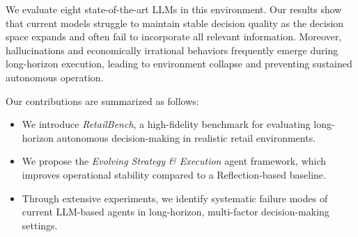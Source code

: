 We evaluate eight state-of-the-art LLMs in this environment. Our results show that current models struggle to maintain stable decision quality as the decision space expands and often fail to incorporate all relevant information. Moreover, hallucinations and economically irrational behaviors frequently emerge during long-horizon execution, leading to environment collapse and preventing sustained autonomous operation.

Our contributions are summarized as follows:
\begin{itemize}[leftmargin=*]
    \item We introduce \textit{RetailBench}, a high-fidelity benchmark for evaluating long-horizon autonomous decision-making in realistic retail environments.
    \item We propose the \textit{Evolving Strategy \& Execution} agent framework, which improves operational stability compared to a Reflection-based baseline.
    \item Through extensive experiments, we identify systematic failure modes of current LLM-based agents in long-horizon, multi-factor decision-making settings.
\end{itemize}
